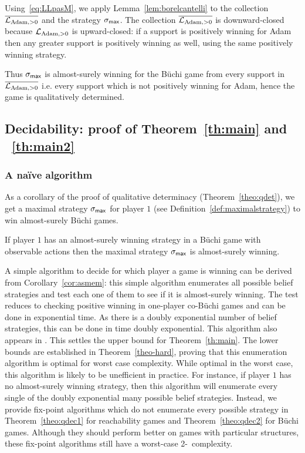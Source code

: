 \medskip


Using~\eqref{eq:LLpasM}, 
we apply Lemma~\ref{lem:borelcantelli} to the collection 
$\overline{\mathcal{L}_{\text{Adam},>0}}$ and the strategy $\sigma_{\textsf{max}}$.
The collection $\overline{\mathcal{L}_{\text{Adam},>0}}$ is downward-closed because $\mathcal{L}_{\text{Adam},>0}$ is upward-closed: if a support is positively winning for Adam then any greater support is positively winning as well, using the same positively winning strategy.

Thus $\sigma_{\textsf{max}}$ is almost-surely winning for the B\"uchi game from every support in $\overline{\mathcal{L}_{\text{Adam},>0}}$ i.e. every support which is not positively winning for Adam, hence the game is qualitatively determined.

\subsection{Decidability: proof of Theorem~\ref{th:main} and ~\ref{th:main2}}

\subsubsection{A na\"ive algorithm}
As a corollary of the proof of qualitative determinacy
(Theorem~\ref{theo:qdet}), we get a maximal strategy $\sigma_{\textsf{max}}$
for player $1$ (see Definition~\ref{def:maximalstrategy}) to win
almost-surely B\"uchi games.
\begin{corollary}\label{cor:asmem}
  If player $1$ has an almost-surely winning strategy in a B\"uchi
  game {with observable actions} then the maximal strategy $\sigma_{\textsf{max}}$ is almost-surely
  winning.
\end{corollary}

{
   A simple algorithm to decide for which player a
  game is winning can be derived from Corollary~\ref{cor:asmem}:
this simple algorithm enumerates all possible belief strategies
  and test each one of them to see if it is almost-surely
  winning. The test reduces to checking positive winning in one-player co-B\"uchi games
and can be done in exponential time.
}
As there is a doubly exponential number of {belief} strategies, 
   this can be done in time doubly exponential. 
This algorithm also appears in \cite{GS-icalp09}.
 This settles the upper bound for Theorem~\ref{th:main}. The lower bounds are established in
  Theorem~\ref{theo-hard}, proving that this enumeration algorithm is
  optimal for worst case complexity.  While optimal in the worst case,
  this algorithm is {likely to be unefficient in practice}.  For instance, if player
  $1$ has no almost-surely winning strategy, then this algorithm will
  enumerate every single of the doubly exponential many {possible belief}
  strategies.  Instead, we provide fix-point algorithms which do not
  enumerate every possible strategy in Theorem~\ref{theo:qdec1} for
  reachability games and Theorem~\ref{theo:qdec2} for B\"uchi games.
  Although they should perform better on games with particular
  structures, these fix-point algorithms still have a worst-case
  2-\EXPTIME\ complexity.


